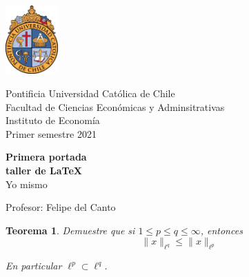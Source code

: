 \documentclass{article}
\newtheorem{teo}{Teorema}
\begin{document}
\begin{titlepage}
	\begin{minipage}{2.5cm}
		\includegraphics[width=2cm]{logouccolor.png}
	\end{minipage}
	\begin{minipage}{13 cm}
		\begin{flushleft}
   			\noindent\large{\sc
				Pontificia Universidad Católica de Chile \\ 
		     		Facultad de Ciencias Económicas y Adminsitrativas \\ 
		     		Instituto de Economía \\ 
				Primer semestre 2021
		     	}
		\end{flushleft}
	\end{minipage}
	
\begin{center}
	\vspace*{\fill}
		\Huge\textbf{Primera portada}	\\
		\Huge\textbf{taller de \LaTeX}	\\
		\LARGE{Yo mismo} \\
	\vspace*{\fill}
		
	\vfill
		
	\Large{Profesor: Felipe del Canto}
\end{center}
\end{titlepage}

\begin{teo} Demuestre que si $1 \leq p \leq q \leq \infty$, entonces
	$$\|x\|_{\ell^{q}} \leq \|x\|_{\ell^{p}}$$
	
En particular $\ell^{p} \subset \ell^{q}$.
\end{teo}
\end{document}
